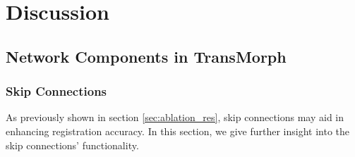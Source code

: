 \documentclass[times,twocolumn,final]{elsarticle}
\begin{document}
\section{Discussion}
\label{sec:discussion}

\subsection{Network Components in TransMorph}
\label{sec:net_ele_discuss}
\subsubsection{Skip Connections}

As previously shown in section \ref{sec:ablation_res}, skip connections may aid in enhancing registration accuracy. In this section, we give further insight into the skip connections' functionality. 
\end{document}
